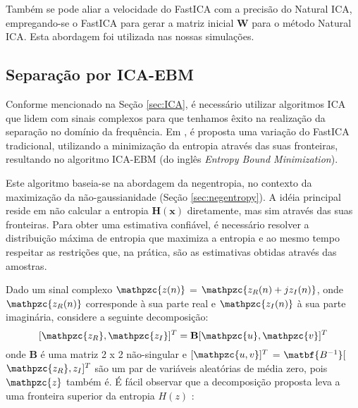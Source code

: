         Também se pode aliar a velocidade do FastICA com a precisão do Natural ICA, empregando-se o FastICA para gerar a matriz inicial $\mathbf{W}$ para o método Natural ICA. Esta abordagem foi utilizada nas nossas simulações.
    
    \subsection{Separação por ICA-EBM}
        
    Conforme mencionado na Seção \ref{sec:ICA}, é necessário utilizar algoritmos ICA que lidem com sinais complexos para que tenhamos êxito na realização da separação no domínio da frequência. Em \cite{fasticaebm}, é proposta uma variação do FastICA tradicional, utilizando a minimização da entropia através das suas fronteiras, resultando no algoritmo ICA-EBM (do inglês \textit{Entropy Bound Minimization}).
        
    Este algoritmo baseia-se na abordagem da negentropia, no contexto da maximização da não-gaussianidade (Seção \ref{sec:negentropy}). A idéia principal reside em não calcular a entropia $\mathbf{H(x)}$ diretamente, mas sim através das suas fronteiras. Para obter uma estimativa confiável, é necessário resolver a distribuição máxima de entropia que maximiza a entropia e ao mesmo tempo respeitar as restrições que, na prática, são as estimativas obtidas através das amostras. 
        
    Dado um sinal complexo $\mathpzc{z(n)}$ = $\mathpzc{z_R(n) + jz_I(n)}$, onde $\mathpzc{z_R(n)}$ corresponde à sua parte real e $\mathpzc{z_I(n)}$ à sua parte imaginária, considere a seguinte decomposição:
    \begin{equation}
        \label{eq:decomposition1}
            [\mathpzc{z_R}, \mathpzc{z_I}]^T =
            \mathbf{B}[\mathpzc{u},\mathpzc{v}]^T
    \end{equation}
    onde $\mathbf{B}$ é uma matriz 2 x 2 não-singular e $[\mathpzc{u,v}]^T$ = $\matbf{B^{-1}}[$ $\mathpzc{z_R},{z_I}]^T$ são um par de variáveis aleatórias de média zero, pois $\mathpzc{z}$ também é. É fácil observar que a decomposição proposta leva a uma fronteira superior da entropia ${H(z)}$ \cite{entropy}:
        
